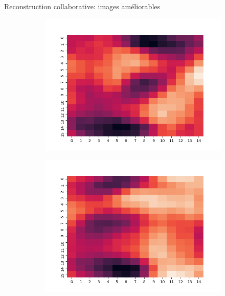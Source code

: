 \documentclass[hyperref={pdfpagelabels=false}]{beamer}
\begin{document}
\begin{frame}{Reconstruction collaborative: images améliorables}
\begin{figure}[h]
\begin{subfigure}[c]{0.18\textwidth}
                \includegraphics[scale=.12]{66}
            \end{subfigure}
            \begin{subfigure}[c]{0.18\textwidth}
                \includegraphics[scale=.12]{77}
            \end{subfigure}
            \begin{subfigure}[c]{0.18\textwidth}

\end{subfigure}
\end{figure}
\end{frame}
\end{document}
